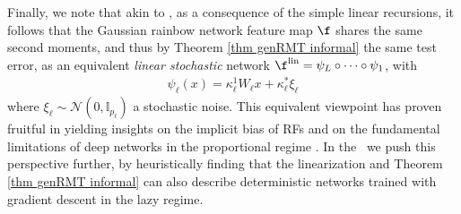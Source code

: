 Finally, we note that akin to \cite{schroder2023deterministic}, as a consequence of the simple linear recursions, it follows that the Gaussian rainbow network feature map $\f$ shares the same second moments, and thus by Theorem \ref{thm genRMT informal} the same test error, as an equivalent \textit{linear stochastic} network $\f^{\mathrm{lin}}=\psi_L \circ\dots\circ\psi_1$, with
\begin{align}
\label{eq:linearized-layer}
    \psi_\ell(x)=\kappa^1_\ell W_\ell x+\kappa^*_\ell\xi_\ell
\end{align}
where $\xi_\ell\sim\mathcal{N}(0,\mathbb{I}_{p_\ell})$ a stochastic noise. This equivalent viewpoint has proven fruitful in yielding insights on the implicit bias of RFs \cite{schroder2023deterministic, Jacot2020} and on the fundamental limitations of deep networks in the proportional regime \cite{Cui2023}. In the~ we push this perspective further, by heuristically finding that the linearization and Theorem \ref{thm genRMT informal} can also describe deterministic networks trained with gradient descent in the lazy regime. 


